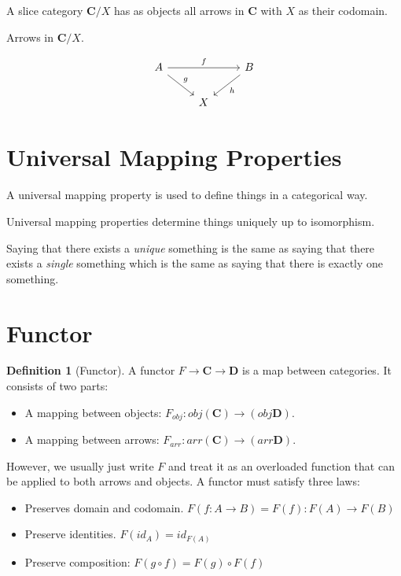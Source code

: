 \documentclass{book}
\theoremstyle{definition}
\newtheorem{definition}{Definition}[section]
\newcommand\id{\mathit{id}}
\begin{document}
A slice category $\mathbf{C}/X$ has as objects all arrows in \textbf{C} with $X$
as their codomain.

Arrows in $\mathbf{C}/X$.

\[
  \begin{tikzcd}
    A \ar[rr, "f"] \ar[dr, "g"] & & B \ar[dl, "h"] \\
    & X
  \end{tikzcd}
\]

\section{Universal Mapping Properties}

A universal mapping property is used to define things in a categorical way.

Universal mapping properties determine things uniquely up to isomorphism.

Saying that there exists a \emph{unique} something is the same as saying that
there exists a \emph{single} something which is the same as saying that there is
exactly one something.

\section{Functor}

\begin{definition}[Functor]
  A functor $F \to \mathbf{C} \to \mathbf{D}$ is a map between categories. It
  consists of two parts:
  \begin{itemize}
  \item A mapping between objects:
    $F_{obj} : obj(\mathbf{C}) \to (obj\mathbf{D})$.
  \item A mapping between arrows:
    $F_{arr} : arr(\mathbf{C}) \to (arr\mathbf{D})$.
  \end{itemize}
  However, we usually just write $F$ and treat it as an overloaded function that
  can be applied to both arrows and objects. A functor must satisfy three laws:
  \begin{itemize}
  \item Preserves domain and codomain. $F(f : A \to B) = F(f) : F(A) \to F(B)$
  \item Preserve identities. $F(\id_A) = \id_{F(A)}$
  \item Preserve composition: $F(g \circ f) = F(g) \circ F(f)$
  \end{itemize}
\end{definition}
\end{document}
